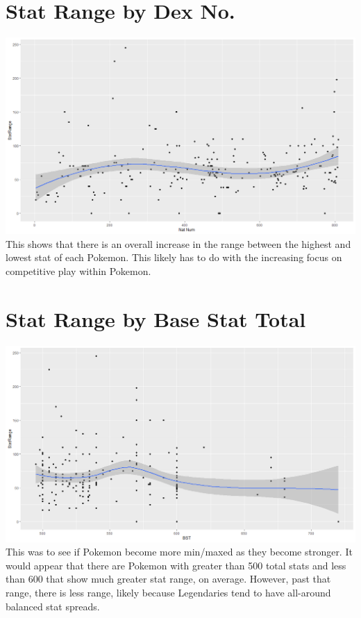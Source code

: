 \documentclass{article}
\begin{document}
\section{Stat Range by Dex No.}

\includegraphics[scale = .4]{PS6b_White.png}
This shows that there is an overall increase in the range between the highest and lowest stat of each Pokemon. This likely has to do with the increasing focus on competitive play within Pokemon.

\section{Stat Range by Base Stat Total}

\includegraphics[scale = .4]{PS6c_White.png}
This was to see if Pokemon become more min/maxed as they become stronger. It would appear that there are Pokemon with greater than 500 total stats and less than 600 that show much greater stat range, on average. However, past that range, there is less range, likely because Legendaries tend to have all-around balanced stat spreads.
\end{document}
